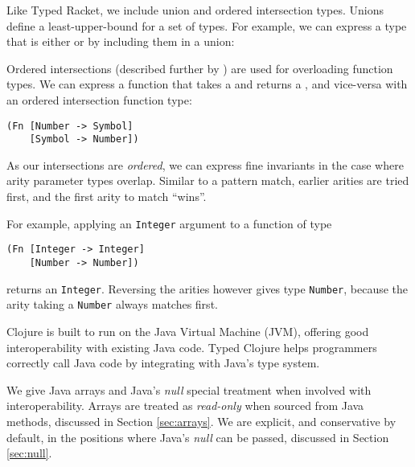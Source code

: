 {}
Like Typed Racket, we include union and ordered intersection types. Unions define
a least-upper-bound for a set of types. For example, we can express a type that is
either \Number or \Symbol by including them in a union: {\Union {\Number} {\Symbol}}

Ordered intersections (described further by \citet{SA+12})
are used for overloading function types. We can express a function that takes
a \Number and returns a \Symbol, and vice-versa with an ordered intersection function type:

\begin{lstlisting}[label=lst:ordered]
(Fn [Number -> Symbol]
    [Symbol -> Number])
\end{lstlisting}

As our intersections are \emph{ordered}, we can express fine invariants in the
case where arity parameter types overlap. Similar to a pattern match, earlier arities 
are tried first, and the first arity to match ``wins''.

For example, applying an \lstinline|Integer| argument to a function of type

\begin{lstlisting}
(Fn [Integer -> Integer]
    [Number -> Number])
\end{lstlisting}

returns an \lstinline|Integer|. Reversing the arities however gives
type \lstinline|Number|, because the arity taking a \lstinline|Number|
always matches first.

{}
Clojure is built to run on the Java Virtual Machine (JVM),
offering good interoperability with existing Java code.
Typed Clojure helps programmers correctly call Java code
by integrating with Java's type system.

We give Java arrays and Java's \emph{null} special treatment
when involved with interoperability. Arrays are treated as \emph{read-only}
when sourced from Java methods, discussed in Section \ref{sec:arrays}.
We are explicit, and conservative by default, in the positions where
Java's \emph{null} can be passed, discussed in Section \ref{sec:null}.


\inputminted[firstline=1]{clojure}{code/demo/src/demo/eg1.clj}
\inputminted[firstline=4]{clojure}{code/demo/src/demo/eg2.clj}
\inputminted[firstline=4]{clojure}{code/demo/src/demo/eg3.clj}
\inputminted[firstline=4]{clojure}{code/demo/src/demo/eg4.clj}
\inputminted[firstline=4,lastline=15]{clojure}{code/demo/src/demo/eg5.clj}
\inputminted[firstline=4,lastline=15]{clojure}{code/demo/src/demo/eg6.clj}
\inputminted[firstline=6,lastline=23]{clojure}{code/demo/src/demo/eg7.clj}

